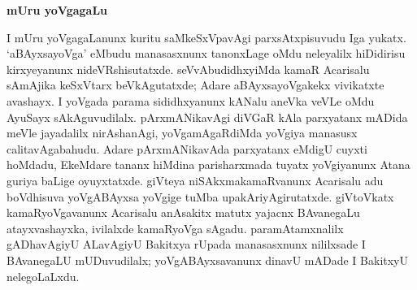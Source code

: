 \begin{center}
\textbf{\Large{mUru yoVgagaLu}}
\end{center}

I mUru yoVgagaLanunx kuritu saMkeSxVpavAgi parxsAtxpisuvudu Iga yukatx. `aBAyxsayoVga' eMbudu manasasxnunx tanonxLage oMdu neleyalilx hiDidirisu kirxyeyanunx nideVRshisutatxde. seVvAbudidhxyiMda kamaR Acarisalu sAmAjika keSxVtarx beVkAgutatxde; Adare aBAyxsayoVgakekx vivikatxte avashayx. I yoVgada parama sididhxyanunx kANalu aneVka veVLe oMdu AyuSayx sAkAguvudilalx. pArxmANikavAgi diVGaR kAla parxyatanx mADida meVle jayadalilx nirAshanAgi, yoVgamAgaRdiMda yoVgiya manasusx calitavAgabahudu. Adare pArxmANikavAda parxyatanx eMdigU cuyxti hoMdadu, EkeMdare tananx hiMdina parisharxmada tuyatx yoVgiyanunx Atana guriya baLige oyuyxtatxde. giVteya niSAkxmakamaRvanunx Acarisalu adu boVdhisuva yoVgABAyxsa yoVgige tuMba upakAriyAgirutatxde. giVtoVkatx kamaRyoVgavanunx Acarisalu anAsakitx matutx yajacnx BAvanegaLu atayxvashayxka, ivilalxde kamaRyoVga sAgadu. paramAtamxnalilx gADhavAgiyU ALavAgiyU Bakitxya rUpada manasasxnunx nililxsade I BAvanegaLU mUDuvudilalx; yoVgABAyxsavanunx dinavU mADade I BakitxyU nelegoLaLxdu.

